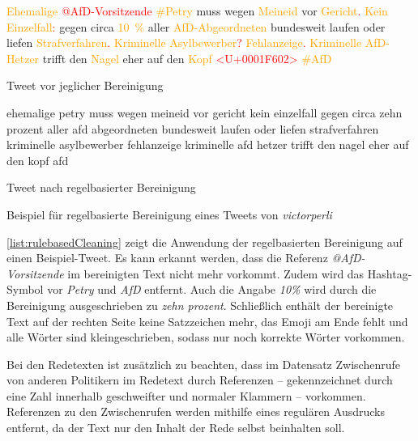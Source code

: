\begin{example}[H]
    {\footnotesize
        \begin{subexample}{0.45\textwidth}
            \textcolor{orange}{Ehemalige} \textcolor{red}{@AfD-Vorsitzende} \textcolor{orange}{\#Petry} muss wegen \textcolor{orange}{Meineid} vor \textcolor{orange}{Gericht}\textcolor{red}{.} \textcolor{orange}{Kein Einzelfall}\textcolor{red}{:} gegen circa \textcolor{orange}{\SI{10}{\percent}} aller \textcolor{orange}{AfD-Abgeordneten} bundesweit laufen oder liefen \textcolor{orange}{Strafverfahren}\textcolor{red}{.} \textcolor{orange}{Kriminelle Asylbewerber}\textcolor{red}{?} \textcolor{orange}{Fehlanzeige}\textcolor{red}{.} \textcolor{orange}{Kriminelle AfD-Hetzer} trifft den \textcolor{orange}{Nagel} eher auf den \textcolor{orange}{Kopf} \textcolor{red}{<U+0001F602>} \textcolor{orange}{\#AfD}
            \caption{Tweet vor jeglicher Bereinigung \parencite{saltzer_finding_2022}}
        \end{subexample}\hfill
        \begin{subexample}{0.45\textwidth}
            ehemalige petry muss wegen meineid vor gericht kein einzelfall gegen circa zehn prozent aller afd abgeordneten bundesweit laufen oder liefen strafverfahren kriminelle asylbewerber fehlanzeige kriminelle afd hetzer trifft den nagel eher auf den kopf afd
            \caption{Tweet nach regelbasierter Bereinigung}
        \end{subexample}\hfill
    }
    \caption[Beispiel -- Regelbasierte Bereinigung]{Beispiel für regelbasierte Bereinigung eines Tweets von \textit{victorperli} \autocite{saltzer_finding_2022}} \label{list:rulebasedCleaning}
\end{example}

\autoref{list:rulebasedCleaning} zeigt die Anwendung der regelbasierten Bereinigung auf einen Beispiel-Tweet. Es kann erkannt werden, dass die Referenz \textit{@AfD-Vorsitzende} im bereinigten Text nicht mehr vorkommt. Zudem wird das Hashtag-Symbol vor \textit{Petry} und \textit{AfD} entfernt. Auch die Angabe \textit{10\%} wird durch die Bereinigung ausgeschrieben zu \textit{zehn prozent}. Schließlich enthält der bereinigte Text auf der rechten Seite keine Satzzeichen mehr, das Emoji am Ende fehlt und alle Wörter sind kleingeschrieben, sodass nur noch korrekte Wörter vorkommen.

Bei den Redetexten ist zusätzlich zu beachten, dass im Datensatz Zwischenrufe von anderen Politikern im Redetext durch Referenzen -- gekennzeichnet durch eine Zahl innerhalb geschweifter und normaler Klammern -- vorkommen. Referenzen zu den Zwischenrufen werden mithilfe eines regulären Ausdrucks entfernt, da der Text nur den Inhalt der Rede selbst beinhalten soll.

